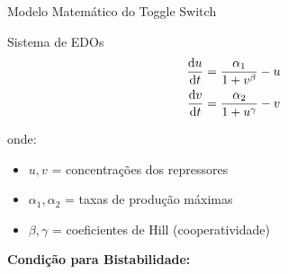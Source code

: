 \begin{frame}{Modelo Matemático do Toggle Switch}
\begin{block}{Sistema de EDOs}
\begin{align*}
\frac{\mathrm{d} u}{\mathrm{d} t} &= \frac{\alpha_1}{1 + v^{\beta}} - u\\
\frac{\mathrm{d} v}{\mathrm{d} t} &= \frac{\alpha_2}{1 + u^{\gamma}} - v
\end{align*}

onde:
\begin{itemize}
    \item $u, v$ = concentrações dos repressores
    \item $\alpha_1, \alpha_2$ = taxas de produção máximas
    \item $\beta, \gamma$ = coeficientes de Hill (cooperatividade)
\end{itemize}
\end{block}

\textbf{Condição para Bistabilidade:}
\end{frame}

